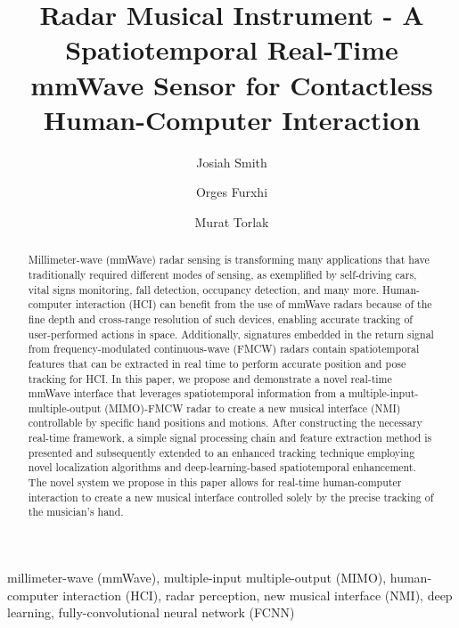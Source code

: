 \documentclass[10pt,journal,final]{IEEEtran}
\begin{document}
\title{Radar Musical Instrument - A Spatiotemporal Real-Time mmWave Sensor for Contactless Human-Computer Interaction}

\author[1]{Josiah Smith}
\author[2]{Orges Furxhi}
\author[1]{Murat Torlak}

\maketitle

\begin{abstract}
Millimeter-wave (mmWave) radar sensing is transforming many applications that have traditionally required different modes of sensing, as exemplified by self-driving cars, vital signs monitoring, fall detection, occupancy detection, and many more. Human-computer interaction (HCI) can benefit from the use of mmWave radars because of the fine depth and cross-range resolution of such devices, enabling accurate tracking of user-performed actions in space. Additionally, signatures embedded in the return signal from frequency-modulated continuous-wave (FMCW) radars contain spatiotemporal features that can be extracted in real time to perform accurate position and pose tracking for HCI. In this paper, we propose and demonstrate a novel real-time mmWave interface that leverages spatiotemporal information from a multiple-input-multiple-output (MIMO)-FMCW radar to create a new musical interface (NMI) controllable by specific hand positions and motions. After constructing the necessary real-time framework, a simple signal processing chain and feature extraction method is presented and subsequently extended to an enhanced tracking technique employing novel localization algorithms and deep-learning-based spatiotemporal enhancement. The novel system we propose in this paper allows for real-time human-computer interaction to create a new musical interface controlled solely by the precise tracking of the musician's hand. 
\end {abstract}

\begin{IEEEkeywords}
	millimeter-wave (mmWave), multiple-input multiple-output (MIMO), human-computer interaction (HCI), radar perception, new musical interface (NMI), deep learning, fully-convolutional neural network (FCNN)
\end{IEEEkeywords}
\end{document}
